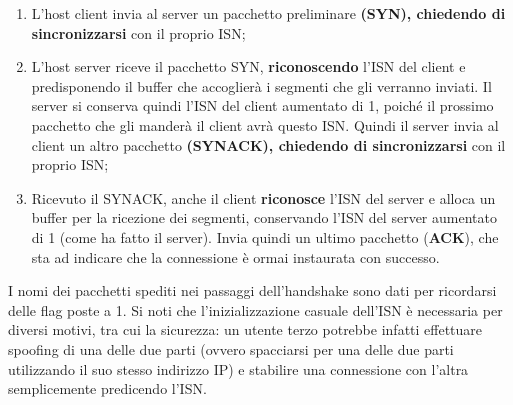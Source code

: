 \documentclass{article}
\begin{document}
        \begin{enumerate}
            \item L’host client invia al server un pacchetto preliminare \textbf{(SYN), chiedendo di
            sincronizzarsi} con il proprio ISN;
            \item  L’host server riceve il pacchetto SYN, \textbf{riconoscendo} l’ISN del client e predisponendo il
            buffer che accoglierà i segmenti che gli verranno inviati. Il server si conserva quindi l’ISN
            del client aumentato di 1, poiché il prossimo pacchetto che gli manderà il client avrà
            questo ISN. Quindi il server invia al client un altro pacchetto \textbf{(SYNACK), chiedendo di
            sincronizzarsi} con il proprio ISN;
            \item Ricevuto il SYNACK, anche il client \textbf{riconosce} l’ISN del server e alloca un buffer per la
            ricezione dei segmenti, conservando l’ISN del server aumentato di 1 (come ha fatto il
            server). Invia quindi un ultimo pacchetto (\textbf{ACK}), che sta ad indicare che la connessione
            è ormai instaurata con successo. 
                        
        \end{enumerate}

        I nomi dei pacchetti spediti nei passaggi dell’handshake sono dati per ricordarsi delle flag poste
        a 1. Si noti che l’inizializzazione casuale dell’ISN è necessaria per diversi motivi, tra cui la
        sicurezza: un utente terzo potrebbe infatti effettuare spoofing di una delle due parti (ovvero
        spacciarsi per una delle due parti utilizzando il suo stesso indirizzo IP) e stabilire una
        connessione con l’altra semplicemente predicendo l’ISN.\\
        
\end{document}
